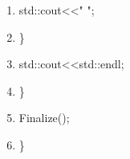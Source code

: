 \documentclass[10pt]{article}
\begin{document}
\begin{shadebox}
\begin{enumerate}
\item \hspace{10pt} \hspace{10pt}         std::cout\textless \textless "    ";
\item \hspace{10pt}         \}
\item \hspace{10pt}         std::cout\textless \textless std::endl;
\item \}
\item Finalize();
\item \}
\end{enumerate}
\end{shadebox}
\end{document}

